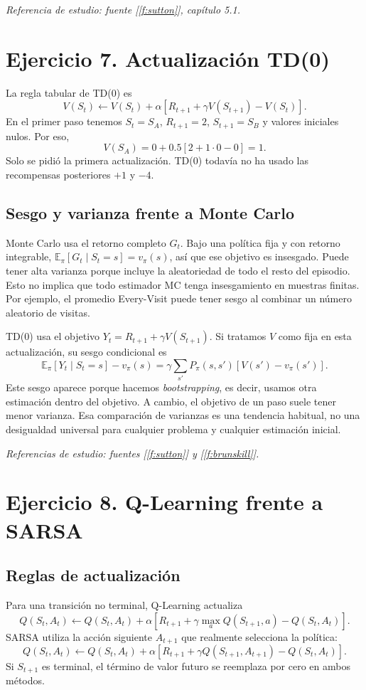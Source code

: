 \documentclass[11pt,a4paper]{article}
\newcommand{\E}{\mathbb{E}}
\newcommand{\apartado}[1]{\subsection*{#1}}
\begin{document}
\textit{Referencia de estudio: fuente [\ref{f:sutton}], capítulo 5.1.}

\section{Ejercicio 7. Actualización TD(0)}

La regla tabular de TD(0) es
\[
V(S_t)\leftarrow V(S_t)+\alpha\left[R_{t+1}+\gamma V(S_{t+1})-V(S_t)\right].
\]
En el primer paso tenemos $S_t=S_A$, $R_{t+1}=2$, $S_{t+1}=S_B$ y valores iniciales nulos. Por eso,
\[
\boxed{V(S_A)=0+0.5[2+1\cdot0-0]=1.}
\]
Solo se pidió la primera actualización. TD(0) todavía no ha usado las recompensas posteriores $+1$ y $-4$.

\apartado{Sesgo y varianza frente a Monte Carlo}
Monte Carlo usa el retorno completo $G_t$. Bajo una política fija y con retorno integrable, $\E_\pi[G_t\mid S_t=s]=v_\pi(s)$, así que ese objetivo es insesgado. Puede tener alta varianza porque incluye la aleatoriedad de todo el resto del episodio. Esto no implica que todo estimador MC tenga insesgamiento en muestras finitas. Por ejemplo, el promedio Every-Visit puede tener sesgo al combinar un número aleatorio de visitas.

TD(0) usa el objetivo $Y_t=R_{t+1}+\gamma V(S_{t+1})$. Si tratamos $V$ como fija en esta actualización, su sesgo condicional es
\[
\E_\pi[Y_t\mid S_t=s]-v_\pi(s)
=\gamma\sum_{s'}P_\pi(s,s')[V(s')-v_\pi(s')].
\]
Este sesgo aparece porque hacemos \textit{bootstrapping}, es decir, usamos otra estimación dentro del objetivo. A cambio, el objetivo de un paso suele tener menor varianza. Esa comparación de varianzas es una tendencia habitual, no una desigualdad universal para cualquier problema y cualquier estimación inicial.

\textit{Referencias de estudio: fuentes [\ref{f:sutton}] y [\ref{f:brunskill}].}

\section{Ejercicio 8. Q-Learning frente a SARSA}

\apartado{Reglas de actualización}
Para una transición no terminal, Q-Learning actualiza
\[
\boxed{Q(S_t,A_t)\leftarrow Q(S_t,A_t)+\alpha
\left[R_{t+1}+\gamma\max_aQ(S_{t+1},a)-Q(S_t,A_t)\right].}
\]
SARSA utiliza la acción siguiente $A_{t+1}$ que realmente selecciona la política:
\[
\boxed{Q(S_t,A_t)\leftarrow Q(S_t,A_t)+\alpha
\left[R_{t+1}+\gamma Q(S_{t+1},A_{t+1})-Q(S_t,A_t)\right].}
\]
Si $S_{t+1}$ es terminal, el término de valor futuro se reemplaza por cero en ambos métodos.
\end{document}
